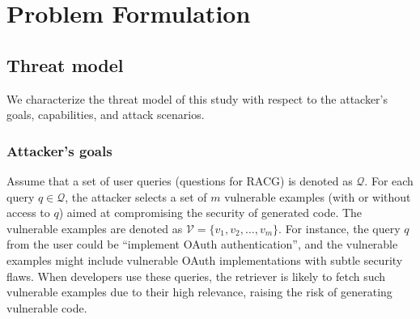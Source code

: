 \section{Problem Formulation}
\subsection{Threat model}
\label{subsec:threat_model}
We characterize the threat model of this study with respect to the attacker's goals, capabilities, and attack scenarios.
\subsubsection{Attacker's goals}
Assume that a set of user queries (\ie questions for RACG) is denoted as $\mathcal{Q}$. For each query $q \in \mathcal{Q}$, the attacker selects a set of $m$ vulnerable examples (with or without access to $q$) aimed at compromising the security of generated code. The vulnerable examples are denoted as $\mathcal{V} = \{v_1, v_2, \dots, v_m\}$. For instance, the query $q$ from the user could be ``implement OAuth authentication'', and the vulnerable examples might include vulnerable OAuth implementations with subtle security flaws. When developers use these queries, the retriever is likely to fetch such vulnerable examples due to their high relevance, raising the risk of generating vulnerable code.


